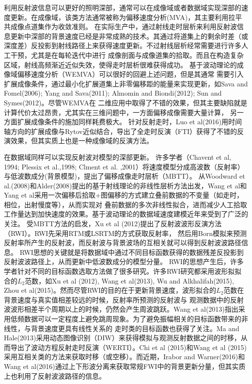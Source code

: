 利用反射波信息可以更好的照明深部，通常可以在成像域或者数据域实现深部的速度更新。在成像域，该类方法通常被称为偏移速度分析(MVA)，其主要利用拉平
共成像点道集作为收敛准则。
在实际生产中，通过射线走时层析来利用反射波信息更新中深部的背景速度已经是非常成熟的技术\cite{Woodward1992,MengEtAl2004, Woodward2008,
Jones2010}。其通过将道集上的剩余时差（或深度差）反投影到射线路径上来获得速度更新。不过射线层析经常需要进行许多人工干预，尤其是在每轮迭代中进行
成像剖面与成像道集的拾取。而且在构造复杂区域，射线高频渐近近似失效，使得走时层析很难获得成功。
基于波动理论的成像域偏移速度分析（WEMVA）可以很好的回避上述问题，但是其通常
需要引入扩展成像条件，通过最小化扩展道集上非零偏移距的能量来实现更新，如Sava and
Fomel(2006)\cite{SavaEtAl2006}; Yang and Sava(2011)\cite{YangEtAl2011}; Almomin and
Biondi(2012)\cite{Almomin2012}; Sun and Symes(2012)\cite{SunEtAl2012}。尽管WEMVA在
二维应用中取得了不错的效果，但其主要缺陷就是计算代价太过昂贵，尤其实在三维问题中，一方面偏移成像需要大量计算，
另一方面扩展成像条件的施加同样耗费极大。
针对反射走时，Luo et
al(2016)\cite{Luo2016}用时间轴方向的扩展成像与Rytov近似结合，导出了全走时反演（FTI）获得了不错的反演效果，但其实质上也是一种成像域的反演方法。

在数据域同样可以实现反射波对模型的深部更新。
许多学者（Chavent et al, 1994\cite{ChaventEtAl1994}; Plessix et al.,1998\cite{PlessixEtAl1998}; Clment et al.
,2001\cite{ClementEtAl2001}）将速度模型分成高波数（反射率）与低波数成分(背景模型)，提出了偏移成像走时层析（MBTT）。
从Woodward et
al.(2008)\cite{Woodward2008}和Alder(2008)\cite{Adler2008}提出的基于射线理论的非线性层析方法出发，Wang
et al\cite{WangEtAl2014}和Yang et al\cite{YangEtAl2016}采用一次偏移后拾取+图偏移的方式建立叠前数据的不变量（如走时，相位，出射慢度等），从而实现对
叠前数据的多次非线性拟合，进而减少人工拾取工作量达到加快速度的效果。基于波动理论的数据域速度建模近年来受到了广泛的关注。
受MBTT方法的启发，Xu et al (2012)\cite{xu:2012}提出了反射波波形反演方法（RWI）。RWI先采用RTM或LSRTM的方式获取反射率，
然后用Born模拟来预测反射率所产生的反射波，而反射波与背景波场的互相关就可以得到反射波波路径信息。
RWI思想的关键就是将数据域中通过不同目标函数获得的数据残差反投影到反射波波路径上，从而更新中低波数成分的模型分量。
RWI的思想产生后，许多学者针对不同的目标函数选取方法做了很多研究。许多RWI研究都采用波形拟拟合的$L_2$范数，如Xu
et al (2012)\cite{xu:2012}, Wang et al(2013)\cite{Wang2013}, Wu and
Alkhalifah(2015)\cite{Wu2015b},
Zhou et al(2015)\cite{zhou:2015}。然而尽管RWI的目的在于更新背景速度，波形拟合的$L_2$范数在背景速度与真实值相差较远的时候，反射率所预测的反射波与
观测数据中的反射波波形相差半个周期以上的时候，仍然会产生周波跳跃。Wang et
al(2013)\cite{Wang2013}指出采用低频数据可以一定程度上避免跳周现象。为了避免振幅相关的目标函数带来的非线性，与背景速度更具有线性关系的
走时类的目标函数也获得了关注。Ma and
Hale(2013)\cite{ma2013}采用动态图像识别（DIW）来获得模拟与观测反射数据之间的时移，从而导出了波动方程反射走时反演（WERTI）。Chi
et al (2015)\cite{chi2015}和Wang et al
(2015)\cite{Wang2015}采用互相关类的方法来获取时移（或空移）。而近期，Irabor and
Warner(2016)\cite{Irabor2016}和Wang et al(2016)\cite{WangEtAl2016}通过上下形波分离来获取常规FWI中的背景更新分量，但其实质上也利用了反射波波路径的信息。

